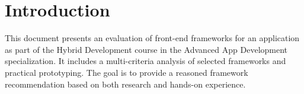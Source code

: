 \section{Introduction}
This document presents an evaluation of front-end frameworks for an application as part of the Hybrid Development course in the Advanced App Development specialization.
It includes a multi-criteria analysis of selected frameworks and practical prototyping.
The goal is to provide a reasoned framework recommendation based on both research and hands-on experience.

